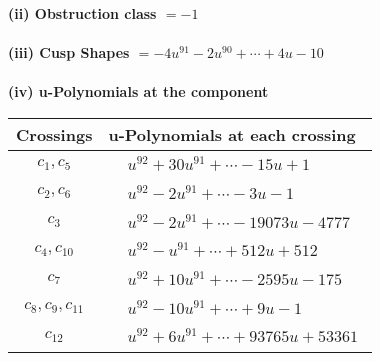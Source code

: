 \documentclass[1p]{elsarticle_modified}
\theoremstyle{definition}
\begin{document}
\flushleft \textbf{(ii) Obstruction class $= -1$}\\~\\
\flushleft \textbf{(iii) Cusp Shapes $= -4 u^{91}-2 u^{90}+\cdots+4 u-10$}\\~\\
\newpage\renewcommand{\arraystretch}{1}
\flushleft \textbf{(iv) u-Polynomials at the component}\newline \\
\begin{tabular}{m{50pt}|m{274pt}}
Crossings & \hspace{64pt}u-Polynomials at each crossing \\
\hline $$\begin{aligned}c_{1},c_{5}\end{aligned}$$&$\begin{aligned}
&u^{92}+30 u^{91}+\cdots-15 u+1
\end{aligned}$\\
\hline $$\begin{aligned}c_{2},c_{6}\end{aligned}$$&$\begin{aligned}
&u^{92}-2 u^{91}+\cdots-3 u-1
\end{aligned}$\\
\hline $$\begin{aligned}c_{3}\end{aligned}$$&$\begin{aligned}
&u^{92}-2 u^{91}+\cdots-19073 u-4777
\end{aligned}$\\
\hline $$\begin{aligned}c_{4},c_{10}\end{aligned}$$&$\begin{aligned}
&u^{92}- u^{91}+\cdots+512 u+512
\end{aligned}$\\
\hline $$\begin{aligned}c_{7}\end{aligned}$$&$\begin{aligned}
&u^{92}+10 u^{91}+\cdots-2595 u-175
\end{aligned}$\\
\hline $$\begin{aligned}c_{8},c_{9},c_{11}\end{aligned}$$&$\begin{aligned}
&u^{92}-10 u^{91}+\cdots+9 u-1
\end{aligned}$\\
\hline $$\begin{aligned}c_{12}\end{aligned}$$&$\begin{aligned}
&u^{92}+6 u^{91}+\cdots+93765 u+53361
\end{aligned}$\\
\hline
\end{tabular}\\~\\
\end{document}
